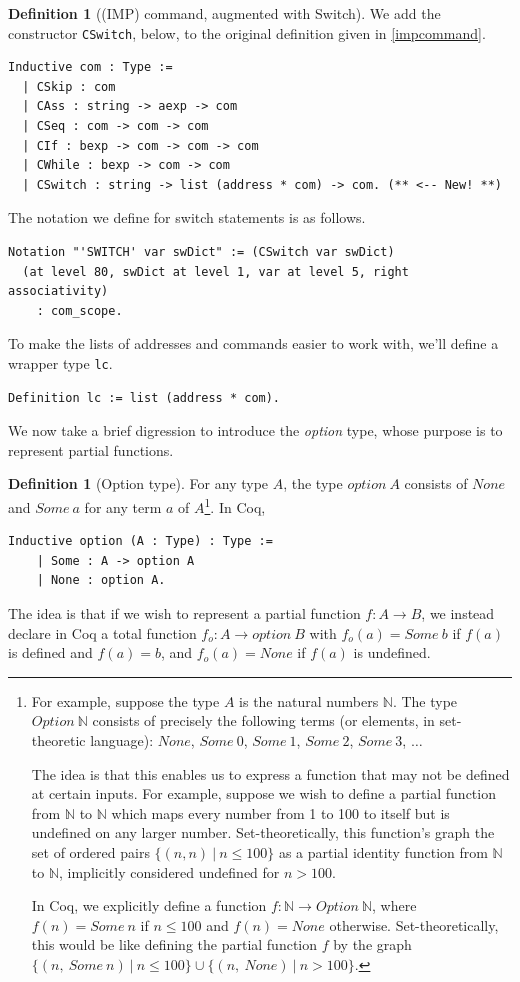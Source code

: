 \documentclass[12pt,notitlepage]{report}
\theoremstyle{plain}
\theoremstyle{definition}
\newtheorem{defin}[theo]{Definition}
\newcommand\N{\mathbb{N}}
\newcommand{\define}[1]{\emph{#1}\index{#1}}
\numberwithin{equation}{section}
\begin{document}
\begin{defin}[(IMP) command, augmented with Switch]
We add the constructor \verb$CSwitch$, below, to the original definition given in \eqref{impcommand}.
\begin{verbatim}
Inductive com : Type :=
  | CSkip : com
  | CAss : string -> aexp -> com
  | CSeq : com -> com -> com
  | CIf : bexp -> com -> com -> com
  | CWhile : bexp -> com -> com
  | CSwitch : string -> list (address * com) -> com. (** <-- New! **)
\end{verbatim}

The notation we define for switch statements is as follows.

\begin{verbatim}
Notation "'SWITCH' var swDict" := (CSwitch var swDict) 
  (at level 80, swDict at level 1, var at level 5, right associativity) 
    : com_scope.
\end{verbatim}
\end{defin}

To make the lists of addresses and commands easier to work with, we'll define a wrapper type \verb$lc$.

\begin{verbatim}
Definition lc := list (address * com).
\end{verbatim}

We now take a brief digression to introduce the \define{option} type, whose purpose is to represent partial functions.
\newpage
\begin{defin}[Option type]
For any type $A$, the type $option\ A$ consists of $None$ and $Some\ a$ for any term $a$ of $A$\footnote{For example, suppose the type $A$ is the natural numbers $\N$.  The type $Option\ \N$ consists of precisely the following terms (or elements, in set-theoretic language): $None$, $Some\ 0$, $Some\ 1$, $Some\ 2$, $Some\ 3$, $\ldots$
\par The idea is that this enables us to express a function that may not be defined at certain inputs.  For example, suppose we wish to define a partial function from $\N$ to $\N$ which maps every number from 1 to 100 to itself but is undefined on any larger number.  Set-theoretically, this function's graph the set of ordered pairs
$\{(n,n)\ |\ n\leq 100\}$ as a partial identity function from $\N$ to $\N$,
implicitly considered undefined for $n > 100$.
\par In Coq, we explicitly define a function $f\colon \N \to Option \ \N$, where $f(n) = Some\ n$ if $n \leq 100$ and $f(n) = None$ otherwise.  Set-theoretically, this would be
like defining the partial function $f$ by the graph 
$\{(n,\ Some\ n)\ |\  n\leq 100\} \cup \{(n,\ None)\ |\ n > 100\}$.
}.  In Coq,
\begin{verbatim}
Inductive option (A : Type) : Type :=
    | Some : A -> option A 
    | None : option A.
\end{verbatim}
The idea is that if we wish to represent a partial function $f\colon A \to B$, we instead declare in Coq a total function $f_o\colon A \to option\ B$ with $f_o(a) = Some\ b$ if $f(a)$ is defined and $f(a)=b$, and $f_o(a) = None$ if $f(a)$ is undefined.
\end{defin}
\end{document}
